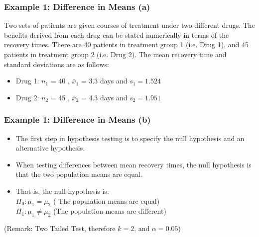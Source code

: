 
\begin{frame}
\frametitle{Example 1: Difference in Means (a) }
Two sets of patients are given courses of treatment under two different drugs. The benefits
derived from each drug can be stated numerically in terms of the recovery times. There are 40 patients in treatment group 1 (i.e. Drug 1), and 45 patients in treatment group 2 (i.e. Drug 2). The mean recovery time and standard deviations are as follows:
\begin{itemize}
\item Drug 1:  $n_1$ = 40 , $\bar{x}_1$ = 3.3 days and $s_1 = 1.524$
\item Drug 2:  $n_2$ = 45 , $\bar{x}_2$ = 4.3 days and $s_2 = 1.951 $
\end{itemize}
\end{frame}

\begin{frame}
\frametitle{Example 1: Difference in Means (b) }
\begin{itemize}
\item The first step in hypothesis testing is to specify the null hypothesis and an alternative hypothesis.
\item When testing differences between mean recovery times, the null hypothesis is that the two population means are equal.
\item That is, the null hypothesis is:\\
$H_0: \mu_1 = \mu_2$ ( The population means are equal)\\
$H_1: \mu_1 \neq \mu_2$ (The population means are different)
\end{itemize}



(Remark: Two Tailed Test, therefore $k = 2$, and $\alpha = 0.05$)
\end{frame}

